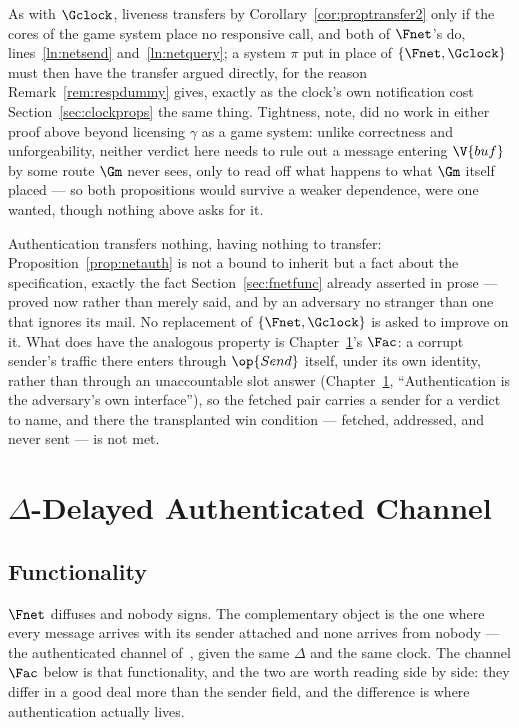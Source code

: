 \documentclass[10pt,oneside,openany]{book}
\makeatletter
\newcommand{\nav@headtext}{}
\newcommand{\nav@setheadtext}[1]{%
  \gdef\nav@headtext{%
    \ifnum\c@secnumdepth>\m@ne
      \if@mainmatter \@chapapp\ \thechapter.\ \fi
    \fi #1}}
\newcommand{\chapterhead}[1]{\nav@setheadtext{#1}}
\theoremstyle{accentdef}
\theoremstyle{accentplain}
\makeatother
\begin{document}
As with $\Gclock$, liveness transfers by Corollary~\ref{cor:proptransfer2} only if the cores of the
game system place no responsive call, and both of $\Fnet$'s do, lines~\ref{ln:netsend}
and~\ref{ln:netquery}; a system $\pi$ put in place of $\{\Fnet,\Gclock\}$ must then have the
transfer argued directly, for the reason Remark~\ref{rem:respdummy} gives, exactly as the clock's
own notification cost Section~\ref{sec:clockprops} the same thing. Tightness, note, did no work
in either proof above beyond licensing $\gamma$ as a game system: unlike correctness and
unforgeability, neither verdict here needs to rule out a message entering $\V{buf}$ by some route
$\Gm$ never sees, only to read off what happens to what $\Gm$ itself placed --- so both
propositions would survive a weaker dependence, were one wanted, though nothing above asks for it.

Authentication transfers nothing, having nothing to transfer: Proposition~\ref{prop:netauth} is
not a bound to inherit but a fact about the specification, exactly the fact
Section~\ref{sec:fnetfunc} already asserted in prose --- proved now rather than merely said, and
by an adversary no stranger than one that ignores its mail. No replacement of $\{\Fnet,\Gclock\}$
is asked to improve on it. What does have the analogous property is Chapter~\ref{sec:fac}'s
$\Fac$: a corrupt sender's traffic there enters through $\op{Send}$ itself, under its own identity,
rather than through an unaccountable slot answer (Chapter~\ref{sec:fac}, ``Authentication is the
adversary's own interface''), so the fetched pair carries a sender for a verdict to name, and there
the transplanted win condition --- fetched, addressed, and never sent --- is not met.

\chapter{\texorpdfstring{$\Delta$}{Δ}-Delayed Authenticated Channel}\label{sec:fac}
\chapterhead{Delta-Delayed Authenticated Channel}

\section{Functionality}\label{sec:facfunc}

$\Fnet$ diffuses and nobody signs. The complementary object is the one where every message
arrives with its sender attached and none arrives from nobody --- the authenticated channel
of~\cite{Canetti20}, given the same $\Delta$ and the same clock. The channel $\Fac$ below is that
functionality, and the two are worth reading side by side: they differ in a good deal more than
the sender field, and the difference is where authentication actually lives.
\end{document}
